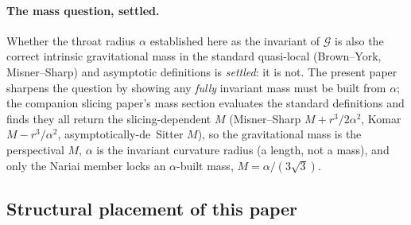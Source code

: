 \documentclass[11pt,a4paper]{article}
\theoremstyle{definition}
\begin{document}
\paragraph{The mass question, settled.} Whether the throat radius $\alpha$ established here as the invariant of $\mathcal{G}$ is also the correct intrinsic gravitational mass in the standard quasi-local (Brown--York, Misner--Sharp) and asymptotic definitions is \emph{settled}: it is not. The present paper sharpens the question by showing any \emph{fully} invariant mass must be built from $\alpha$; the companion slicing paper's mass section evaluates the standard definitions and finds they all return the slicing-dependent $M$ (Misner--Sharp $M+r^{3}/2\alpha^{2}$, Komar $M-r^{3}/\alpha^{2}$, asymptotically-de~Sitter $M$), so the gravitational mass is the perspectival $M$, $\alpha$ is the invariant curvature radius (a length, not a mass), and only the Nariai member locks an $\alpha$-built mass, $M=\alpha/(3\sqrt3)$.


\subsection{Structural placement of this paper}\label{sec:placement}
\end{document}
